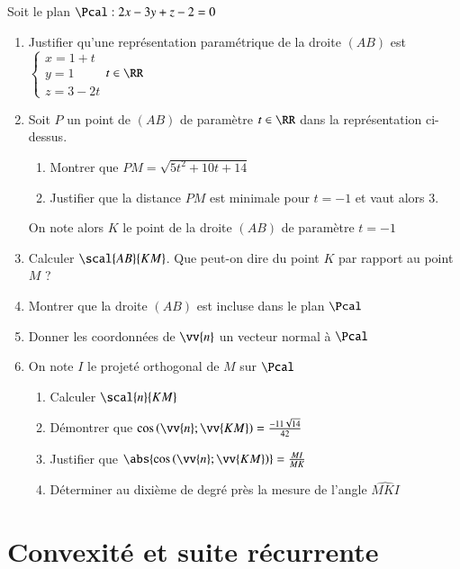 \documentclass[oneside,12pt]{article}
\let\oldsection\section
\renewcommand{\section}{\newpage\oldsection}
\begin{document}
Soit le plan $\Pcal:2x-3y+z-2=0$
\begin{enumerate}
    \item Justifier qu'une représentation paramétrique de la droite $(AB)$ est $\begin{cases}x=1+t\\y=1\\z=3-2t\end{cases}$\quad$t\in\RR$
    \item Soit $P$ un point de $(AB)$ de paramètre $t\in\RR$ dans la représentation ci-dessus.
    \begin{enumerate}
        \item Montrer que $PM=\sqrt{5t^2+10t+14}$
        \item Justifier que la distance $PM$ est minimale pour $t=-1$ et vaut alors $3$.
    \end{enumerate}
    On note alors $K$ le point de la droite $(AB)$ de paramètre $t=-1$
    \item Calculer $\scal{AB}{KM}$. Que peut-on dire du point $K$ par rapport au point $M$ ?
    \item Montrer que la droite $(AB)$ est incluse dans le plan $\Pcal$
    \item Donner les coordonnées de $\vv{n}$ un vecteur normal à $\Pcal$
    \item On note $I$ le projeté orthogonal de $M$ sur $\Pcal$
    \begin{enumerate}
        \item Calculer $\scal{n}{KM}$
        \item Démontrer que $\cos\left(\vv{n};\vv{KM}\right)=\frac{-11\sqrt{14}}{42}$
        \item Justifier que $\abs{\cos\left(\vv{n};\vv{KM}\right)}=\frac{MI}{MK}$
        \item Déterminer au dixième de degré près la mesure de l'angle $\widehat{MKI}$
    \end{enumerate}
\end{enumerate}






\section{Convexité et suite récurrente}
\end{document}
